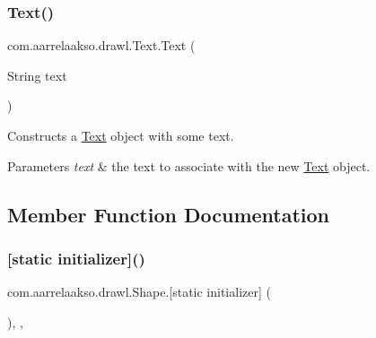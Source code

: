 \subsubsection{\texorpdfstring{Text()}{Text()}\hspace{0.1cm}{\footnotesize\ttfamily [2/2]}}
{\footnotesize\ttfamily com.\+aarrelaakso.\+drawl.\+Text.\+Text (\begin{DoxyParamCaption}\item[{String}]{text }\end{DoxyParamCaption})}

Constructs a \hyperlink{classcom_1_1aarrelaakso_1_1drawl_1_1_text}{Text} object with some text.


\begin{DoxyParams}{Parameters}
{\em text} & the text to associate with the new \hyperlink{classcom_1_1aarrelaakso_1_1drawl_1_1_text}{Text} object. \\
\hline
\end{DoxyParams}


\subsection{Member Function Documentation}
\mbox{\label{classcom_1_1aarrelaakso_1_1drawl_1_1_shape_ad2adcb85374cf5d6d59429628314e8d1}} 
\subsubsection{\texorpdfstring{[static initializer]()}{[static initializer]()}}
{\footnotesize\ttfamily com.\+aarrelaakso.\+drawl.\+Shape.\mbox{[}static initializer\mbox{]} (\begin{DoxyParamCaption}{ }\end{DoxyParamCaption})\hspace{0.3cm}{\ttfamily [static]}, {\ttfamily [package]}, {\ttfamily [inherited]}}

\mbox{\label{classcom_1_1aarrelaakso_1_1drawl_1_1_shape_acebea2aa57031322323c9bf50ee447db}} 
